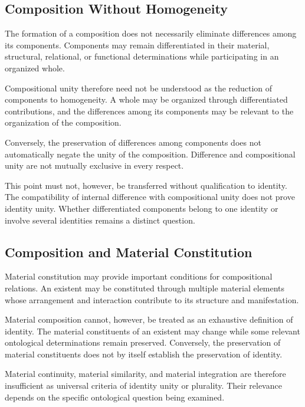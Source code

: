 \subsection{Composition Without Homogeneity}

The formation of a composition does not necessarily
eliminate differences among its components. Components
may remain differentiated in their material, structural,
relational, or functional determinations while participating
in an organized whole.

Compositional unity therefore need not be understood
as the reduction of components to homogeneity. A whole
may be organized through differentiated contributions,
and the differences among its components may be relevant
to the organization of the composition.

Conversely, the preservation of differences among
components does not automatically negate the unity
of the composition. Difference and compositional unity
are not mutually exclusive in every respect.

This point must not, however, be transferred without
qualification to identity. The compatibility of internal
difference with compositional unity does not prove
identity unity. Whether differentiated components
belong to one identity or involve several identities
remains a distinct question.

\subsection{Composition and Material Constitution}

Material constitution may provide important conditions
for compositional relations. An existent may be constituted
through multiple material elements whose arrangement
and interaction contribute to its structure and
manifestation.

Material composition cannot, however, be treated as
an exhaustive definition of identity. The material
constituents of an existent may change while some
relevant ontological determinations remain preserved.
Conversely, the preservation of material constituents
does not by itself establish the preservation of identity.

Material continuity, material similarity, and material
integration are therefore insufficient as universal
criteria of identity unity or plurality. Their relevance
depends on the specific ontological question being examined.

